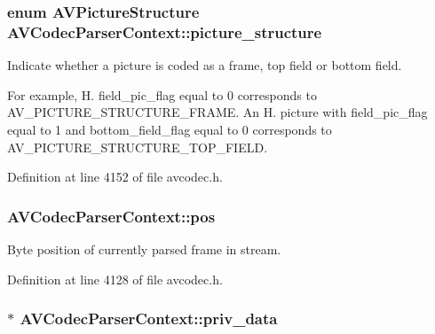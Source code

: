 \subsubsection[{\texorpdfstring{picture\+\_\+structure}{picture_structure}}]{\setlength{\rightskip}{0pt plus 5cm}enum {\bf A\+V\+Picture\+Structure} A\+V\+Codec\+Parser\+Context\+::picture\+\_\+structure}\hypertarget{struct_a_v_codec_parser_context_a8dd687b78f23d6f2160b853b6d1dee08}{}\label{struct_a_v_codec_parser_context_a8dd687b78f23d6f2160b853b6d1dee08}
Indicate whether a picture is coded as a frame, top field or bottom field.

For example, H. field\+\_\+pic\+\_\+flag equal to 0 corresponds to A\+V\+\_\+\+P\+I\+C\+T\+U\+R\+E\+\_\+\+S\+T\+R\+U\+C\+T\+U\+R\+E\+\_\+\+F\+R\+A\+ME. An H. picture with field\+\_\+pic\+\_\+flag equal to 1 and bottom\+\_\+field\+\_\+flag equal to 0 corresponds to A\+V\+\_\+\+P\+I\+C\+T\+U\+R\+E\+\_\+\+S\+T\+R\+U\+C\+T\+U\+R\+E\+\_\+\+T\+O\+P\+\_\+\+F\+I\+E\+LD. 

Definition at line 4152 of file avcodec.\+h.

\subsubsection[{\texorpdfstring{pos}{pos}}]{ A\+V\+Codec\+Parser\+Context\+::pos}\hypertarget{struct_a_v_codec_parser_context_a6cb1cf94ba19b6df4aa2c3c0a43beac7}{}\label{struct_a_v_codec_parser_context_a6cb1cf94ba19b6df4aa2c3c0a43beac7}
Byte position of currently parsed frame in stream. 

Definition at line 4128 of file avcodec.\+h.

\subsubsection[{\texorpdfstring{priv\+\_\+data}{priv_data}}]{$\ast$ A\+V\+Codec\+Parser\+Context\+::priv\+\_\+data}\hypertarget{struct_a_v_codec_parser_context_a50c37cbfe40edf7edb0fdf3644124eb8}{}\label{struct_a_v_codec_parser_context_a50c37cbfe40edf7edb0fdf3644124eb8}


